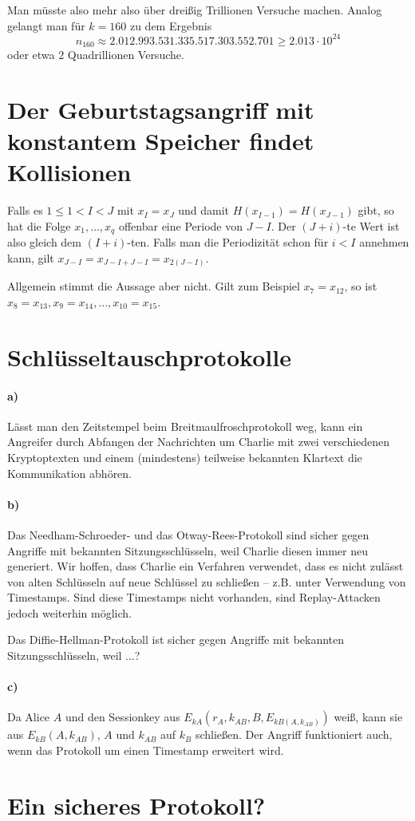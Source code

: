 \documentclass{../crypto}
\begin{document}
Man müsste also mehr also über dreißig Trillionen
Versuche machen. Analog gelangt man für $k=160$ zu dem Ergebnis 
\begin{equation*}
   n_{160} \approx 2.012.993.531.335.517.303.552.701 \ge 2.013 \cdot 10^{24}
\end{equation*}
oder etwa $2$ Quadrillionen Versuche.

\section{Der Geburtstagsangriff mit konstantem Speicher findet Kollisionen}

Falls es $1 \le 1 < I < J$ mit $x_I = x_J$ und damit $H(x_{I-1}) = H(x_{J-1})$
gibt, so hat die Folge $x_1,\ldots,x_q$ offenbar eine Periode von $J - I$. Der
$(J+i)$-te Wert ist also gleich dem $(I+i)$-ten. Falls man die Periodizität schon für $i
< I$ annehmen kann, gilt $x_{J-I} = x_{J-I + J-I} = x_{2(J-I)}$.

Allgemein stimmt die Aussage aber nicht. Gilt zum Beispiel $x_7 = x_{12}$, so
ist $x_8 = x_{13}, x_9 = x_{14},\ldots,x_{10} = x_{15}$.


\section{Schlüsseltauschprotokolle}

\paragraph{a)} Lässt man den Zeitstempel beim Breitmaulfroschprotokoll weg, kann
ein Angreifer durch Abfangen der Nachrichten um Charlie mit zwei verschiedenen
Kryptoptexten und einem (mindestens) teilweise bekannten Klartext die
Kommunikation abhören.

\paragraph{b)} Das Needham-Schroeder- und das Otway-Rees-Protokoll 
sind sicher gegen Angriffe mit bekannten Sitzungsschlüsseln, weil Charlie diesen
immer neu generiert. Wir hoffen, dass Charlie ein Verfahren verwendet, dass es 
nicht zulässt von alten Schlüsseln auf neue Schlüssel zu schließen -- z.B.
unter Verwendung von Timestamps. Sind diese Timestamps nicht vorhanden, sind
Replay-Attacken jedoch weiterhin möglich.

Das Diffie-Hellman-Protokoll ist sicher gegen Angriffe mit bekannten 
Sitzungsschlüsseln, weil ...?


\paragraph{c)} Da Alice $A$ und den Sessionkey aus 
$E_{kA}(r_A,k_{AB},B,E_{kB(A,k_{AB})})$ weiß, kann sie aus $E_{kB}(A,k_{AB})$, 
$A$ und $k_{AB}$ auf $k_B$ schließen. Der Angriff funktioniert auch, wenn das 
Protokoll um einen Timestamp erweitert wird.

\section{Ein sicheres Protokoll?}
\end{document}
